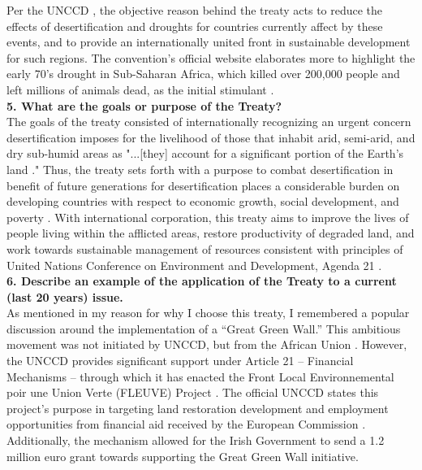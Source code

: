 \documentclass[12pt]{article}
\begin{document}
Per the UNCCD \cite{Convention}, the objective reason behind the treaty acts to reduce the effects of desertification and droughts for countries currently affect by these events, and to provide an internationally united front in sustainable development for such regions. The convention's official website elaborates more to highlight the early 70's drought in Sub-Saharan Africa, which killed over 200,000 people and left millions of animals dead, as the initial stimulant \cite{About}. \\

\textbf{5. What are the goals or purpose of the Treaty?} \\

The goals of the treaty consisted of internationally recognizing an urgent concern desertification imposes for the livelihood of those that inhabit arid, semi-arid, and dry sub-humid areas as "...[they] account for a significant portion of the Earth's land \cite{Convention}." Thus, the treaty sets forth with a purpose to combat desertification in benefit of future generations for desertification places a considerable burden on developing countries with respect to economic growth, social development, and poverty \cite{Convention}. With international corporation, this treaty aims to improve the lives of people living within the afflicted areas, restore productivity of degraded land, and work towards sustainable management of resources consistent with principles of United Nations Conference on Environment and Development, Agenda 21 \cite{About, Convention}. \\

\textbf{6. Describe an example of the application of the Treaty to a current (last 20 years) issue.} \\

As mentioned in my reason for why I choose this treaty, I remembered a popular discussion around the implementation of a ``Great Green Wall.'' This ambitious movement was not initiated by UNCCD, but from the African Union \cite{GreenWall}. However, the UNCCD provides significant support under Article 21 -- Financial Mechanisms \cite{Convention} -- through which it has enacted the Front Local Environnemental poir une Union Verte (FLEUVE) Project \cite{GreenWall}. The official UNCCD states this project's purpose in targeting land restoration development and employment opportunities from financial aid received by the European Commission \cite{GreenWall}. Additionally, the mechanism allowed for the Irish Government to send a 1.2 million euro grant towards supporting the Great Green Wall \cite{GreenWall} initiative. \\
\end{document}
